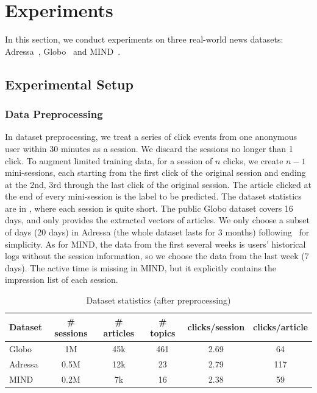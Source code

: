\section{Experiments}
\label{sec:experiment}
In this section, we conduct experiments on three real-world news datasets: 
Adressa~\cite{gulla_adressa_2017}, Globo~\cite{gabriel2019contextual} and MIND~\cite{wu2020mind}. 

\subsection{Experimental Setup}
\subsubsection{Data Preprocessing}
In dataset preprocessing, we treat a series of click events from one anonymous user 
within 30 minutes as a session. 
We discard the sessions no longer than 1 click.
To augment limited training data, for a session of $n$ clicks, we create $n-1$ mini-sessions, 
each starting from the first click of the original session and ending at the 2nd, 3rd through
the last click of the original session. The article clicked at the end of every mini-session is 
the label to be predicted. The dataset statistics are 
in , where each session is quite short. The public Globo dataset covers 16 days, and only provides the extracted vectors of articles. We only choose a subset of days (20 days)
in Adressa (the whole dataset lasts for 3 months) following~\cite{gabriel2019contextual} 
for simplicity. As for MIND, the data from the first several weeks is 
users' historical logs without the session information, so we choose the data from the last week (7 days). The active time is missing in MIND, but it explicitly contains the impression list of each session.

\begin{table}[th]\setlength{\tabcolsep}{2.5pt}
  \caption{Dataset statistics (after preprocessing)}
  \label{tb:dataset}
  \centering
  \renewcommand{\arraystretch}{1.3}
  \begin{tabular}{|l|c|c|c|c|c|}
    \hline
     Dataset & \# sessions & \# articles & \# topics & clicks/session  & clicks/article \\
    \hline
    Globo & 1M & 45k & 461 & 2.69 & 64  \\
    Adressa & 0.5M & 12k & 23 & 2.79 & 117 \\
    MIND & 0.2M & 7k & 16 & 2.38 & 59 \\
    \hline
  \end{tabular}
\end{table}

